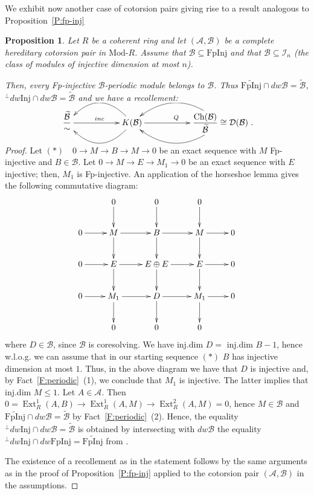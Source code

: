 \documentclass[11pt,a4paper,reqno]{amsart}
\newcommand{\Ext}{\operatorname{Ext}}
\newcommand{\A}{\mathcal{A}}
\newcommand{\B}{\mathcal{B}}
\newcommand{\D}{\mathcal{D}}
\newcommand{\I}{\mathcal{I}}
\newcommand{\Ch}{\mathrm{Ch}}
\newcommand{\Modr}[1]{\mathrm{Mod}\textrm{-}{#1}}
\newcommand{\Inj}{\mathrm{Inj}}
\newcommand{\FpInj}{\mathrm{FpInj}}
\theoremstyle{plain}
\newtheorem{prop}[thm]{Proposition}
\theoremstyle{definition}
\theoremstyle{remark}
\begin{document}
We exhibit now another case of cotorsion pairs giving rise to a result analogous to Proposition~\ref{P:fp-inj}

%
%
%
%
%
%
%
%
%
%
%
%

\begin{prop}\label{P:B-inj-n} Let $R$ be a coherent ring and let $(\A, \B)$ be a complete hereditary cotorsion pair in $\Modr R$. Assume that $\B\subseteq \FpInj$ and that $\B\subseteq \I_n$ (the class of modules of injective dimension at most $n$).

 Then, every Fp-injective  $\B$-periodic module belongs to $\B$. Thus
 $\widetilde{\FpInj}\cap dw \B=\tilde{\B}$, $ ^\perp dw\Inj \cap dw\B=\tilde{\B}$ and we have a recollement:
%
\vskip0.7cm
\[
\xymatrix{\dfrac{ \widetilde{\B}}{\sim} \ar[rr]^{inc} &&{K(\B)} \ar@/^2pc/[ll]\ar@/_2pc/[ll] \ar[rr]^{Q}
&&{\dfrac{\Ch(\B)}{ \widetilde{\B}}\cong \D(\B)}\ar@/^2pc/ [ll] \ar@/_2pc/ [ll] }
.\]
\vskip0.7cm

%
%
\end{prop}
 \begin{proof} Let $(\ast)\quad 0\to M\to B\to M\to 0$ be an exact sequence with $M$ Fp-injective and $B\in \B$. Let $ 0\to M\to E\to M_1\to 0$ be an exact sequence with $E$ injective; then, $M_1$ is Fp-injective. An application of the horseshoe lemma gives the following commutative diagram:
 \[\xymatrix{
&0 \ar[d]  & 0 \ar[d] & 0 \ar[d] \\
0 \ar[r] & M \ar[d] \ar[r] &B\ar[r] \ar[d] & M\ar[d]  \ar[r] & 0 \\
0 \ar[r] & E \ar[d] \ar[r] &E\oplus E\ar[r] \ar[d] & E\ar[d]  \ar[r] & 0  \\
0 \ar[r] & M_1 \ar[d]\ar[r] &D\ar[r] \ar[d] & M_1\ar[d]  \ar[r] & 0 \\
&0 & 0 & 0
}
\]
where  $D\in \B$, since $\B$ is coresolving. We have inj.dim $D=$ inj.dim $B-1$, hence w.l.o.g. we can assume that in our starting sequence  $(\ast)$ $B$ has injective dimension at most $1$. Thus, in the above diagram we have that $D$ is injective and, by Fact~\ref{F:periodic}~(1), we conclude that $M_1$ is injective. The latter implies that inj.dim $M\leq 1$.
Let $A\in \A.$ Then $0=\Ext^1_R(A, B)\to \Ext^1_R(A, M)\to \Ext^2_R(A, M)=0$, hence $M\in \B$ and
$\widetilde{\FpInj}\cap dw \B=\tilde{\B}$  by Fact~\ref{F:periodic}~(2).  Hence, the equality $ ^\perp dw\Inj \cap dw\B=\tilde{\B}$ is obtained by intersecting with $dw\B$ the equality $^\perp{} dw\Inj\cap dw \FpInj=\widetilde{\FpInj}$ from \cite[Proposition 6.11 ]{Stopurity}.

The existence of a recollement as in the statement follows by the same arguments as in the proof of Proposition~\ref{P:fp-inj} applied to the cotorsion pair $(\A, \B)$ in the assumptions.\end{proof}
\end{document}
